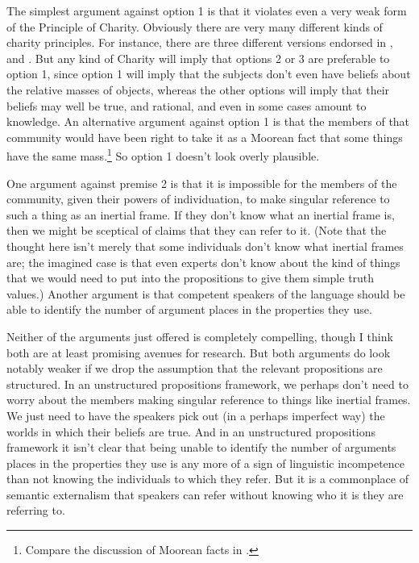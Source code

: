 The simplest argument against option 1 is that it violates even a very weak form of the Principle of Charity. Obviously there are very many different kinds of charity principles. For instance, there are three different versions endorsed in \citet{Davidson1970-DAVME}, \citet{Lewis1974c} and \cite[Ch. 8]{Williamson2007-WILTPO-17}. But any kind of Charity will imply that options 2 or 3 are preferable to option 1, since option 1 will imply that the subjects don't even have beliefs about the relative masses of objects, whereas the other options will imply that their beliefs may well be true, and rational, and even in some cases amount to knowledge. An alternative argument against option 1 is that the members of that community would have been right to take it as a Moorean fact that some things have the same mass.\footnote{Compare the discussion of Moorean facts in \cite[489]{Lewis1994a}.} So option 1 doesn't look overly plausible.

One argument against premise 2 is that it is impossible for the members of the community, given their powers of individuation, to make singular reference to such a thing as an inertial frame. If they don't know what an inertial frame is, then we might be sceptical of claims that they can refer to it. (Note that the thought here isn't merely that some individuals don't know what inertial frames are; the imagined case is that even experts don't know about the kind of things that we would need to put into the propositions to give them simple truth values.) Another argument is that competent speakers of the language should be able to identify the number of argument places in the properties they use.

Neither of the arguments just offered is completely compelling, though I think both are at least promising avenues for research. But both arguments  do look notably weaker if we drop the assumption that the relevant propositions are structured. In an unstructured propositions framework, we perhaps don't need to worry about the members making singular reference to things like inertial frames. We just need to have the speakers pick out (in a perhaps imperfect way) the worlds in which their beliefs are true. And in an unstructured propositions framework it isn't clear that being unable to identify the number of arguments places in the properties they use is any more of a sign of linguistic incompetence than not knowing the individuals to which they refer. But it is a commonplace of semantic externalism that speakers can refer without knowing who it is they are referring to.

